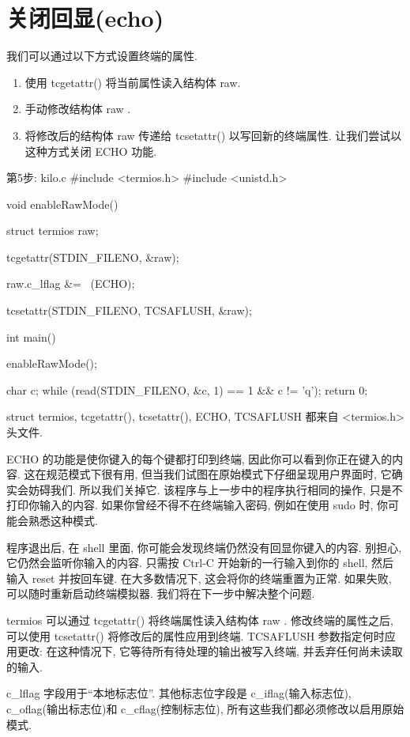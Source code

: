 \documentclass[lang=cn,newtx,10pt,scheme=chinese]{elegantbook}
\begin{document}
\section{关闭回显(echo)}

我们可以通过以下方式设置终端的属性.

\begin{enumerate}
    \item 使用 tcgetattr() 将当前属性读入结构体 raw.
    \item 手动修改结构体 raw .
    \item 将修改后的结构体 raw 传递给 tcsetattr() 以写回新的终端属性. 让我们尝试以这种方式关闭 ECHO 功能.
\end{enumerate}

\begin{mycode}{第5步: kilo.c}
#include <termios.h>
#include <unistd.h>

void enableRawMode() {
  struct termios raw;

  tcgetattr(STDIN_FILENO, &raw);

  raw.c_lflag &= ~(ECHO);

  tcsetattr(STDIN_FILENO, TCSAFLUSH, &raw);
}

int main() {
  enableRawMode();

  char c;
  while (read(STDIN_FILENO, &c, 1) == 1 && c != 'q');
  return 0;
}
\end{mycode}

struct termios, tcgetattr(), tcsetattr(), ECHO, TCSAFLUSH 都来自 <termios.h> 头文件.

ECHO 的功能是使你键入的每个键都打印到终端, 因此你可以看到你正在键入的内容. 这在规范模式下很有用, 但当我们试图在原始模式下仔细呈现用户界面时, 它确实会妨碍我们. 所以我们关掉它. 该程序与上一步中的程序执行相同的操作, 只是不打印你输入的内容. 如果你曾经不得不在终端输入密码, 例如在使用 sudo 时, 你可能会熟悉这种模式.

程序退出后, 在 shell 里面, 你可能会发现终端仍然没有回显你键入的内容. 别担心, 它仍然会监听你输入的内容. 只需按 Ctrl-C 开始新的一行输入到你的 shell, 然后输入 reset 并按回车键. 在大多数情况下, 这会将你的终端重置为正常. 如果失败, 可以随时重新启动终端模拟器. 我们将在下一步中解决整个问题.

termios 可以通过 tcgetattr() 将终端属性读入结构体 raw . 修改终端的属性之后, 可以使用 tcsetattr() 将修改后的属性应用到终端. TCSAFLUSH 参数指定何时应用更改: 在这种情况下, 它等待所有待处理的输出被写入终端, 并丢弃任何尚未读取的输入.

c\_lflag 字段用于``本地标志位''. 其他标志位字段是 c\_iflag(输入标志位), c\_oflag(输出标志位)和 c\_cflag(控制标志位), 所有这些我们都必须修改以启用原始模式.
\end{document}

